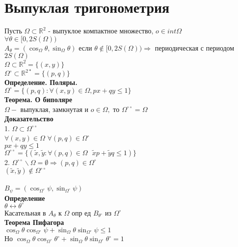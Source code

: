 \documentclass{article}
\newcommand\0{\mathbb{0}}
\newcommand\1{\mathbb{1}}
\renewcommand{\bf}{\textbf}
\newcommand{\lrto}{\leftrightarrow}
\newcommand{\Rto}{\Rightarrow}
\begin{document}
\section{Выпуклая тригонометрия}
Пусть $\Omega \subset \mathbb{R}^2$ - выпуклое компактное множество, $o \in int\Omega$\\
$\forall \theta \in [0, 2S(\Omega))$\\
$A_\theta = (\cos_\Omega\theta, \sin_\Omega\theta)$ если $\theta \notin [0, 2S(\Omega)) \Rto$ периодическая с периодом $2S(\Omega)$\\
$\Omega \subset \mathbb{R}^2 = \{(x, y)\}$\\
$\Omega^\circ \subset \mathbb{R}^{2*} = \{(p, q)\}$\\
\bf{Определение. Поляры.}\\
$\Omega^\circ = \{(p, q): \forall (x, y) \in \Omega, px + qy \leq 1\}$\\
\bf{Теорема. О биполяре}\\
$\Omega -$ выпуклая, замкнутая и $o \in \Omega,$ то $\Omega^{\circ \circ} = \Omega$\\
\bf{Доказательство}\\
1. $\Omega \subset \Omega^{\circ \circ}$\\
$\forall (x, y) \in \Omega$ $\forall (p, q) \in \Omega^\circ$\\
$px + qy \leq 1$\\
$\Omega^{\circ \circ} = \{(\widetilde{x}, \widetilde{y}: \forall (p, q) \in \Omega\text{  }\widetilde{x}p + \widetilde{y}q \leq 1)\}$\\
2. $\Omega^{\circ \circ} \backslash \Omega = \emptyset \Rto (p, q) \in \Omega^\circ$\\
$(\widetilde{x}, \widetilde{y}) \notin \Omega^{\circ \circ}$\\
\\
$B_\psi = (\cos_{\Omega^\circ} \psi, \sin_{\Omega^\circ} \psi)$\\
\bf{Определение}\\
$\theta \lrto \theta^\circ$\\
Касательная в $A_\theta$ к $\Omega$ опр ед $B_{\theta^\circ}$ из $\Omega^\circ$\\
\bf{Теорема Пифагора}\\
$\cos_\Omega\theta \cos_{\Omega^\circ} \psi + \sin_\Omega\theta \sin_{\Omega^\circ} \psi \leq 1$\\
Но $\cos_\Omega\theta \cos_{\Omega^\circ} \theta^\circ + \sin_\Omega\theta \sin_{\Omega^\circ} \theta^\circ = 1$\\
\end{document}
